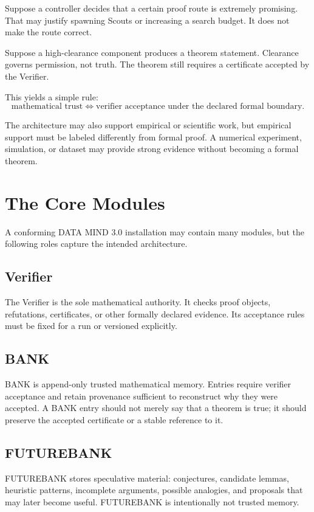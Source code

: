 \documentclass[11pt]{article}
\begin{document}
Suppose a controller decides that a certain proof route is extremely promising. That may justify spawning Scouts or increasing a search budget. It does not make the route correct.

Suppose a high-clearance component produces a theorem statement. Clearance governs permission, not truth. The theorem still requires a certificate accepted by the Verifier.

This yields a simple rule:
\[
\text{mathematical trust} \iff \text{verifier acceptance under the declared formal boundary}.
\]

The architecture may also support empirical or scientific work, but empirical support must be labeled differently from formal proof. A numerical experiment, simulation, or dataset may provide strong evidence without becoming a formal theorem.

\section{The Core Modules}

A conforming DATA MIND 3.0 installation may contain many modules, but the following roles capture the intended architecture.\cite{freeze}

\subsection{Verifier}

The Verifier is the sole mathematical authority. It checks proof objects, refutations, certificates, or other formally declared evidence. Its acceptance rules must be fixed for a run or versioned explicitly.

\subsection{BANK}

BANK is append-only trusted mathematical memory. Entries require verifier acceptance and retain provenance sufficient to reconstruct why they were accepted. A BANK entry should not merely say that a theorem is true; it should preserve the accepted certificate or a stable reference to it.

\subsection{FUTUREBANK}

FUTUREBANK stores speculative material: conjectures, candidate lemmas, heuristic patterns, incomplete arguments, possible analogies, and proposals that may later become useful. FUTUREBANK is intentionally not trusted memory.
\end{document}
